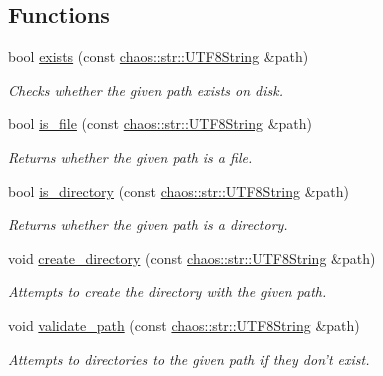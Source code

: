 \subsection*{Functions}
\begin{DoxyCompactItemize}
\item 
bool \hyperlink{namespacechaos_1_1io_1_1file_a61827a50efb6151300a110df0551e21e}{exists} (const \hyperlink{classchaos_1_1str_1_1_u_t_f8_string}{chaos\-::str\-::\-U\-T\-F8\-String} \&path)
\begin{DoxyCompactList}\small\item\em Checks whether the given path exists on disk. \end{DoxyCompactList}\item 
bool \hyperlink{namespacechaos_1_1io_1_1file_a654dba5a0f9ac90c667f7dc235e10f2c}{is\-\_\-file} (const \hyperlink{classchaos_1_1str_1_1_u_t_f8_string}{chaos\-::str\-::\-U\-T\-F8\-String} \&path)
\begin{DoxyCompactList}\small\item\em Returns whether the given path is a file. \end{DoxyCompactList}\item 
bool \hyperlink{namespacechaos_1_1io_1_1file_aeb4d9f84e6fddbe1015c8a30b58b3a6c}{is\-\_\-directory} (const \hyperlink{classchaos_1_1str_1_1_u_t_f8_string}{chaos\-::str\-::\-U\-T\-F8\-String} \&path)
\begin{DoxyCompactList}\small\item\em Returns whether the given path is a directory. \end{DoxyCompactList}\item 
\hypertarget{namespacechaos_1_1io_1_1file_afedb17553b2e87582d10304e2f7a5b5a}{void \hyperlink{namespacechaos_1_1io_1_1file_afedb17553b2e87582d10304e2f7a5b5a}{create\-\_\-directory} (const \hyperlink{classchaos_1_1str_1_1_u_t_f8_string}{chaos\-::str\-::\-U\-T\-F8\-String} \&path)}\label{namespacechaos_1_1io_1_1file_afedb17553b2e87582d10304e2f7a5b5a}

\begin{DoxyCompactList}\small\item\em Attempts to create the directory with the given path. \end{DoxyCompactList}\item 
void \hyperlink{namespacechaos_1_1io_1_1file_a81859724aba8453eb17a10e0b843e5ff}{validate\-\_\-path} (const \hyperlink{classchaos_1_1str_1_1_u_t_f8_string}{chaos\-::str\-::\-U\-T\-F8\-String} \&path)
\begin{DoxyCompactList}\small\item\em Attempts to directories to the given path if they don't exist. \end{DoxyCompactList}\end{DoxyCompactItemize}


